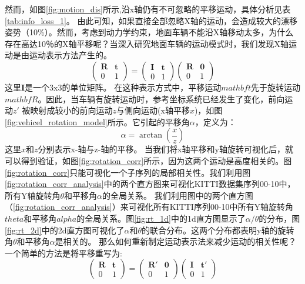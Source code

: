 然而，如图\ref{fig:motion_dis}所示,沿x轴仍有不可忽略的平移运动，具体分析见表\ref{tab:info_loss_1}。
由此可知，如果直接全部忽略X轴的运动，会造成较大的漂移姿势（10\%）。然而，考虑到动力学约束，地面车辆不能沿X轴移动太多，为什么
存在高达10％的X轴平移呢？当深入研究地面车辆的运动模式时，我们发现X轴运动是由运动表示方法产生的。
\begin{equation}
    \begin{pmatrix} \mathbf{R} & \mathbf{t}\\ 0 & 1  \end{pmatrix} = \begin{pmatrix} \mathbf{I}& \mathbf{t}\\ 0 & 1  \end{pmatrix}\begin{pmatrix} \mathbf{R}& \mathbf{0}\\ 0 & 1  \end{pmatrix}
    \label{eq:ftlr}
\end{equation}
这里$\mathbf{I}$是一个3x3的单位矩阵。
在这种表示方式中，平移运动$mathbf{t}$先于旋转运动$mathbf{R}$。因此，当车辆有旋转运动时，参考坐标系统已经发生了变化，前向运动$z'$
被映射成较小的前向运动$z$与侧向运动(x轴平移{$x$})，如图\ref{fig:vehicel_rotation_model}所示。它引起的平移角$\alpha$，定义为： 
\begin{equation}
    \alpha = \arctan\left(\frac{x}{z}\right)
\end{equation}
这里$x$和$z$分别表示x-轴与z-轴的平移。
当我们将x轴平移和y轴旋转可视化后，就可以得到验证，如图\ref{fig:rotation_corr}所示，因为这两个运动是高度相关的。图\ref{fig:rotation_corr}只能可视化一个子序列的局部相关性。我们利用图\ref{fig:rotation_corr_analysis}中的两个直方图来可视化KITTI数据集序列00-10中，所有Y轴旋转角$\theta$和平移角$\alpha$的全局关系。
我们利用图中的两个直方图（\ref{fig:rotation_corr_analysis}）来可视化所有KITTI序列00-10中所有Y轴旋转角$theta$和平移角$alpha$的全局关系。图\ref{fig:rt_1d}中的1d直方图显示了$\alpha/\theta$的分布，图\ref{fig:rt_2d}中的2d直方图可视化了$\alpha$和$\theta$的联合分布。这两个分布都表明y轴的旋转角$\theta$和平移角$\alpha$是相关的。
那么如何重新制定运动表示法来减少运动的相关性呢？一个简单的方法是将平移重写为:
\begin{equation}
    \begin{pmatrix} \mathbf{R} & \mathbf{t}\\ 0 & 1  \end{pmatrix} = \begin{pmatrix} \mathbf{R'}& \mathbf{0}\\ 0 & 1  \end{pmatrix}\begin{pmatrix} \mathbf{I}& \mathbf{t'}\\ 0 & 1  \end{pmatrix}
    \label{eq:frlt}
    \end{equation}

